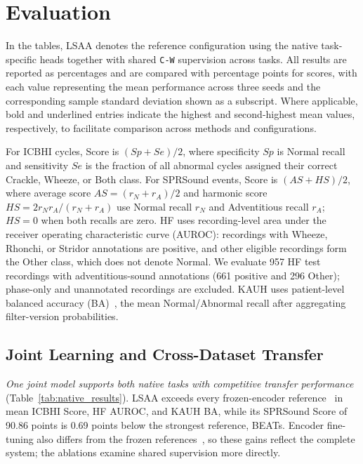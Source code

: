 \begingroup
\setlength{\emergencystretch}{1.5em}
\section{Evaluation}
\label{sec:evaluation}
In the tables, LSAA denotes the reference configuration using the native task-specific heads together with shared \texttt{C-W} supervision across tasks. All results are reported as percentages and are compared with percentage points for scores, with each value representing the mean performance across three seeds and the corresponding sample standard deviation shown as a subscript. Where applicable, bold and underlined entries indicate the highest and second-highest mean values, respectively, to facilitate comparison across methods and configurations.

For ICBHI cycles, Score is $(Sp+Se)/2$, where specificity $Sp$ is Normal recall and sensitivity $Se$ is the fraction of all abnormal cycles assigned their correct Crackle, Wheeze, or Both class\cite{rocha2019icbhi}. For SPRSound events, Score is $(AS+HS)/2$, where average score $AS=(r_N+r_A)/2$ and harmonic score $HS=2r_Nr_A/(r_N+r_A)$ use Normal recall $r_N$ and Adventitious recall $r_A$; $HS=0$ when both recalls are zero\cite{zhang2022sprsound}. HF uses recording-level area under the receiver operating characteristic curve (AUROC): recordings with Wheeze, Rhonchi, or Stridor annotations are positive, and other eligible recordings form the Other class, which does not denote Normal. We evaluate 957 HF test recordings with adventitious-sound annotations (661 positive and 296 Other); phase-only and unannotated recordings are excluded. KAUH uses patient-level balanced accuracy (BA)~\cite{brodersen2010balanced}, the mean Normal/Abnormal recall after aggregating filter-version probabilities.

\subsection{Joint Learning and Cross-Dataset Transfer}
\vspace{2mm}
\label{sec:protocol}
\label{sec:native_results}
\emph{One joint model supports both native tasks with competitive transfer performance} (Table~\ref{tab:native_results}). LSAA exceeds every frozen-encoder reference~\cite{niizumi2025foundationeval,niizumi2025m2dresp} in mean ICBHI Score, HF AUROC, and KAUH BA, while its SPRSound Score of 90.86 points is 0.69 points below the strongest reference, BEATs. Encoder fine-tuning also differs from the frozen references~\cite{niizumi2025foundationeval}, so these gains reflect the complete system; the ablations examine shared supervision more directly.

